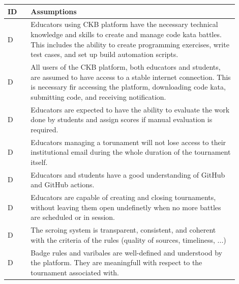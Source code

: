 \setcounter{ac}{0}
\newcommand{\ca}{\stepcounter{ac}\theac}

\newcommand{\myrow}[1]{
    A\ca & #1 \\
    \hline
}

\begin{center}
    \begin{longtable}{ |l|p{0.9\linewidth}| }
        \hline
        \textbf{ID} & \textbf{Assumptions}                                                                   \\
        \hline
        D\ca        & Educators using CKB platform have the necessary technical knowledge and skills to create and manage code kata battles. 
        This includes the ability to create programming exercises, write test cases, and set up build automation scripts.                                   \\
        \hline
        D\ca        & All users of the CKB platform, both educators and students, are assumed to have access to a stable internet connection. This is
         necessary fir accessing the platform, downloading code kata, submitting code, and receiving notification.                                  \\
        \hline
        D\ca        & Educators are expected to have the ability to evaluate the work done by students and assign scores if manual evaluation is required. \\
        \hline
        D\ca        & Educators managing a torunament will not lose access to their institutional email during the whole duration of the tournament itself.                                                             \\
        \hline
        D\ca        & Educators and students have a good understanding of GitHub and GitHub actions.                                  \\
        \hline
        D\ca        & Educators are capable of creating and closing tournaments, without leaving them open undefinetly when no more battles are scheduled or in session.                      \\
        \hline
        D\ca        & The scroing system is transparent, consistent, and coherent with the criteria of the rules (quality of sources, timeliness, ...) \\
        \hline
        D\ca        & Badge rules and varibales are well-defined and understood by the platform. They are meaningfull with respect to the tournament associated with. \\

\end{longtable}
\end{center}
